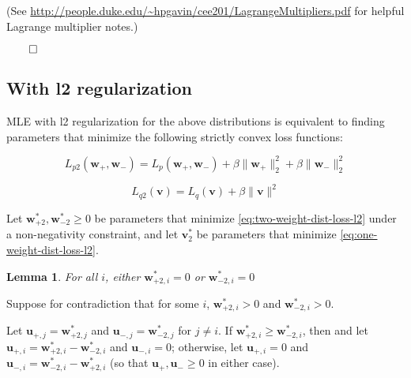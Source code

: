 \documentclass[11pt,letterpaper]{article}
\newtheorem{lemma}{Lemma}[section]
\begin{document}
(See \url{http://people.duke.edu/~hpgavin/cee201/LagrangeMultipliers.pdf} for helpful Lagrange multiplier notes.)

$\qed$

\subsection{With l2 regularization}

MLE with l2 regularization for the above distributions is 
equivalent to finding parameters that minimize the following strictly 
convex loss functions:

\begin{equation}
\label{eq:two-weight-dist-loss-l2}
L_{p2}(\mathbf{w}_+,\mathbf{w}_-)=L_p(\mathbf{w}_+,\mathbf{w}_-)+\beta \| \mathbf{w}_+\|^2_2+\beta \|\mathbf{w}_-\|^2_2
\end{equation}

\begin{equation}
\label{eq:one-weight-dist-loss-l2}
L_{q2}(\mathbf{v})= L_q(\mathbf{v})+\beta \|\mathbf{v}\|^2
\end{equation}

Let $\mathbf{w}^*_{+2},\mathbf{w}^*_{-2}\geq 0$ be parameters that minimize 
\ref{eq:two-weight-dist-loss-l2} under a non-negativity 
 constraint, and let $\mathbf{v}^*_2$ be parameters that 
minimize \ref{eq:one-weight-dist-loss-l2}.

\begin{lemma}
\label{lemma:not-both-positive}
For all $i$, either $\mathbf{w}^*_{+2,i}=0$ or $\mathbf{w}^*_{-2,i}=0$ 
\end{lemma}

Suppose for contradiction that for some $i$, 
$\mathbf{w}^*_{+2,i}>0$ and $\mathbf{w}^*_{-2,i}>0$.  

Let $\mathbf{u}_{+,j}=\mathbf{w}^*_{+2,j}$
and $\mathbf{u}_{-,j}=\mathbf{w}^*_{-2,j}$ for $j\neq i$. 
If $\mathbf{w}^*_{+2,i}\geq \mathbf{w}^*_{-2,i}$, then and let 
$\mathbf{u}_{+,i}=\mathbf{w}^*_{+2,i}-\mathbf{w}^*_{-2,i}$ and $\mathbf{u}_{-,i}=0$; otherwise, let
$\mathbf{u}_{+,i}=0$ and $\mathbf{u}_{-,i}=\mathbf{w}^*_{-2,i}-\mathbf{w}^*_{+2,i}$ (so that $\mathbf{u}_+,\mathbf{u}_-\geq 0$
in either case).
\end{document}
